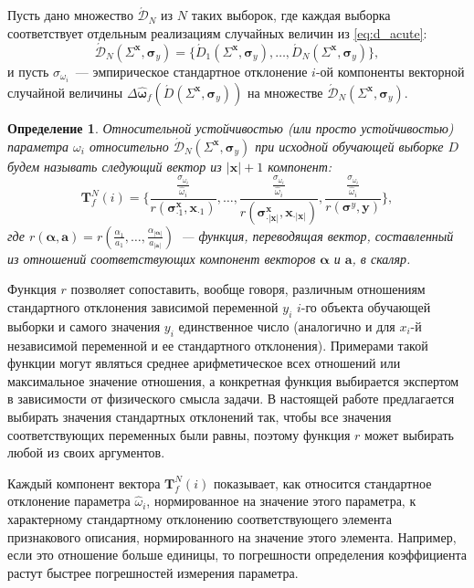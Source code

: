 \documentclass[12pt,a4paper]{article}
\newtheorem{defin}{Определение}
\begin{document}
Пусть дано множество $\acute{\mathcal{D}}_N$ из $N$ таких выборок, где каждая выборка
соответствует отдельным реализациям случайных величин из \eqref{eq:d_acute}:
\[
  \acute{\mathcal{D}}_N (\Sigma^{\mathbf{x}}, \boldsymbol{\sigma}_y) = \{ \acute{D}_1 (\Sigma^{\mathbf{x}}, \boldsymbol{\sigma}_y), \dots, \acute{D}_N (\Sigma^{\mathbf{x}}, \boldsymbol{\sigma}_y) \},
\]
и пусть $\sigma_{\omega_i}$~--- эмпирическое стандартное отклонение $i$-ой компоненты
векторной случайной величины
$\Delta\hat{\boldsymbol{\omega}}_f(\acute{D} (\Sigma^{\mathbf{x}}, \boldsymbol{\sigma}_y) )$
на множестве $\acute{\mathcal{D}}_N (\Sigma^{\mathbf{x}}, \boldsymbol{\sigma}_y)$.
\begin{defin}
\emph{Относительной устойчивостью} (или просто \emph{устойчивостью}) параметра
$\omega_i$ относительно $\acute{\mathcal{D}}_N (\Sigma^{\mathbf{x}}, \boldsymbol{\sigma}_y)$
при исходной обучающей выборке $D$ будем называть следующий вектор
из $| \mathbf{x} | + 1$ компонент:
\begin{equation}
  \mathbf{T}^N_f(i) = \Big\{ \frac{\frac{\sigma_{\omega_i}}{\hat{\omega}_i}}{r(\boldsymbol{\sigma}^\mathbf{x}_{\cdot 1}, \mathbf{x}_{\cdot 1})}, \dots, \frac{\frac{\sigma_{\omega_i}}{\hat{\omega}_i}}{r(\boldsymbol{\sigma}^\mathbf{x}_{\cdot |\mathbf{x}|}, \mathbf{x}_{\cdot |\mathbf{x}|})}, \frac{\frac{\sigma_{\omega_i}}{\hat{\omega}_i}}{r(\boldsymbol{\sigma}^y, \mathbf{y})} \Big\},
  \label{eq:t_rel}
\end{equation}
где $r(\boldsymbol{\alpha}, \mathbf{a}) = r(\frac{\alpha_1}{a_1}, \dots, \frac{\alpha_{|\boldsymbol{\alpha}|}}{a_{|\mathbf{a}|}})$~---
функция, переводящая вектор, составленный из отношений соответствующих компонент векторов $\boldsymbol{\alpha}$ и $\mathbf{a}$, в скаляр.
\end{defin}

Функция $r$ позволяет сопоставить, вообще говоря, различным отношениям стандартного
отклонения зависимой переменной $y_i$ $i$-го объекта обучающей выборки и самого значения $y_i$
единственное число (аналогично и для $x_i$-й независимой переменной и ее стандартного отклонения).
Примерами такой функции могут являться среднее арифметическое
всех отношений или максимальное значение отношения, а конкретная функция выбирается
экспертом в зависимости от физического смысла задачи.
В настоящей работе предлагается выбирать значения стандартных отклонений так, чтобы
все значения соответствующих переменных были равны, поэтому функция $r$ может выбирать
любой из своих аргументов.

Каждый компонент вектора $\mathbf{T}^N_f(i)$ показывает, как относится стандартное отклонение
параметра $\hat{\omega}_i$, нормированное на значение этого параметра, к характерному стандартному
отклонению соответствующего элемента признакового описания, нормированного на значение этого
элемента. Например, если это отношение больше единицы, то погрешности определения коэффициента
растут быстрее погрешностей измерения параметра.
\end{document}
